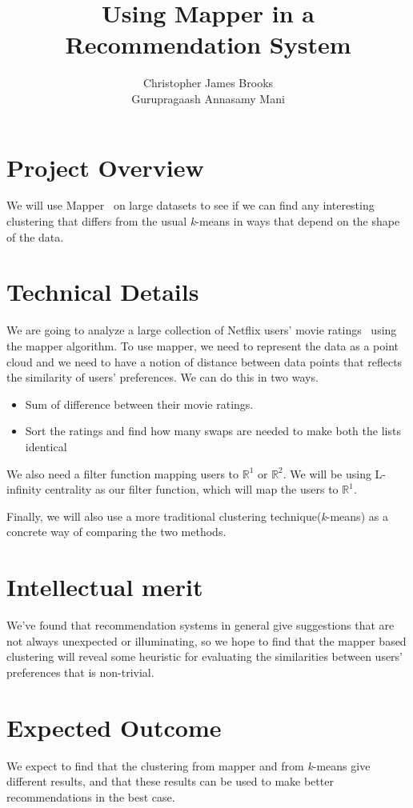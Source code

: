 \documentclass[12pt]{article}
\begin{document}
\title {Using Mapper in a Recommendation System}

\author{
Christopher James Brooks\\ 
Gurupragaash Annasamy Mani}

\maketitle

\section{Project Overview}
We will use Mapper~\cite{Lum2013} on large datasets to see if we can find any interesting clustering that differs from the usual \textit{k}-means in ways that depend on the shape of the data.

\section{Technical Details}
We are going to analyze a large collection of Netflix users' movie ratings~\cite{Netflix} using the mapper algorithm. To use mapper, we need to represent the data as a point cloud and we need to have a notion of distance between data points that reflects the similarity of users' preferences. We can do this in two ways. 
\begin{itemize}
  \item Sum of difference between their movie ratings.
  \item Sort the ratings and find how many swaps are needed to make both the lists identical 
\end{itemize}
We also need a filter function mapping users to $\mathbb{R}^1$ or $\mathbb{R}^2$. We will be using L-infinity centrality as our filter function, which will map the users to $\mathbb{R}^1$. 

Finally, we will also use a more traditional clustering technique(\textit{k}-means) as a concrete way of comparing the two methods.

\section{Intellectual merit}
We've found that recommendation systems in general give suggestions that are not always unexpected or illuminating, so we hope to find that the mapper based clustering will reveal some heuristic for evaluating the similarities between users' preferences that is non-trivial.

\section{Expected Outcome}
We expect to find that the clustering from mapper and from \textit{k}-means give different results, and that these results can be used to make better recommendations in the best case.



\end{document}
